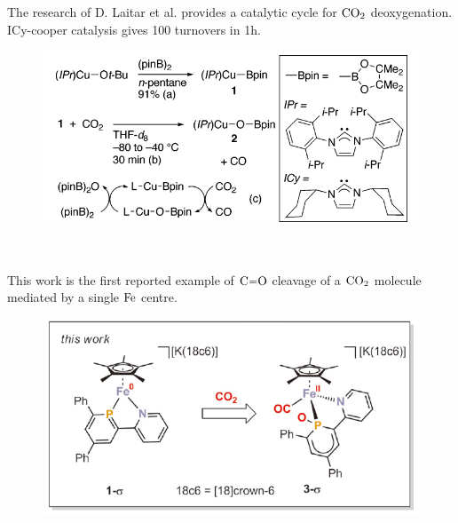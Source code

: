 \documentclass[10pt,aspectratio=43]{beamer}
\numberwithin{equation}{section}
\begin{document}
\begin{frame}
The research of D. Laitar et al. provides a catalytic cycle for $ \ce{CO_2} $ deoxygenation. ICy-cooper catalysis gives 100 turnovers in 1h.
\begin{figure}
	\includegraphics[width=0.7\linewidth]{laitar.jpg}
\end{figure}
\hfill\footnotesize{}\\
\end{frame}


\begin{frame}
This work is the first reported example of $ \ce{C=O} $ cleavage of a $ \ce{CO_2} $ molecule mediated by a single $ \ce{Fe} $ centre.
\begin{figure}
	\includegraphics[width=0.6\linewidth]{reax.jpg}
	\caption{\footnotesize{}}
	\label{fig:reax}
\end{figure}
\end{frame}
\end{document}
